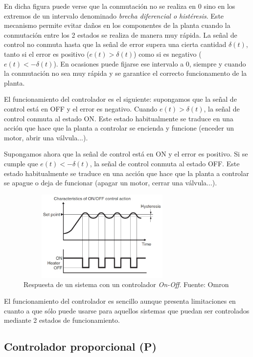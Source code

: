 	En dicha figura puede verse que la conmutación no se realiza en 0 sino en los extremos de un intervalo denominado \textit{brecha diferencial o histéresis}. Este mecanismo permite evitar daños en los componentes de la planta cuando la conmutación entre los 2 estados se realiza de manera muy rápida. La señal de control no conmuta hasta que la señal de error supera una cierta cantidad $\delta(t)$, tanto si el error es positivo ($e(t) > \delta(t)$) como si es negativo ($e(t) < -\delta(t)$). En ocasiones puede fijarse ese intervalo a 0, siempre y cuando la conmutación no sea muy rápida y se garantice el correcto funcionamento de la planta.

	El funcionamiento del controlador es el siguiente: supongamos que la señal de control está en OFF y el error es negativo. Cuando $e(t) > \delta(t)$, la señal de control conmuta al estado ON. Este estado habitualmente se traduce en una acción que hace que la planta a controlar se encienda y funcione (enceder un motor, abrir una válvula...). 

	Supongamos ahora que la señal de control está en ON y el error es positivo. Si se cumple que $e(t) < -\delta(t)$, la señal de control conmuta al estado OFF. Este estado habitualmente se traduce en una acción que hace que la planta a controlar se apague o deja de funcionar (apagar un motor, cerrar una válvula...).

\begin{figure}[htbp]
\centering
\includegraphics[width=85mm,height=45mm]{imagenes/capitulo2/2_2_On-Off}
\caption {Respuesta de un sistema con un controlador \textit{On-Off}. Fuente: Omron \cite{fabricante1}}
\label{fig2_2:on-off}
\end{figure}

	El funcionamiento del controlador es sencillo aunque presenta limitaciones en cuanto a que sólo puede usarse para aquellos sistemas que puedan ser controlados mediante 2 estados de funcionamiento.

\subsection{Controlador proporcional (P)}

